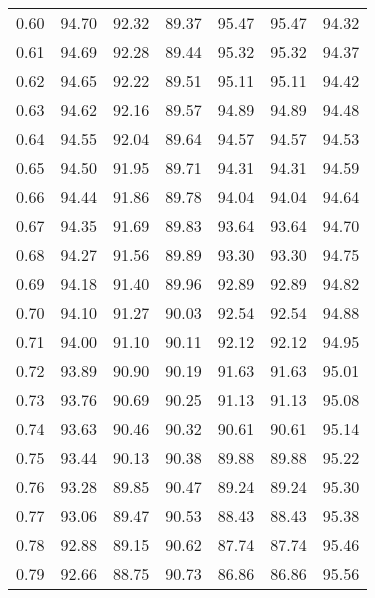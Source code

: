 \begin{tabular}{|c|c|c|c|c|c|c|}
      0.60 &     94.70 &     92.32 &      89.37 &   95.47 &      95.47 &         94.32 \\
      0.61 &     94.69 &     92.28 &      89.44 &   95.32 &      95.32 &         94.37 \\
      0.62 &     94.65 &     92.22 &      89.51 &   95.11 &      95.11 &         94.42 \\
      0.63 &     94.62 &     92.16 &      89.57 &   94.89 &      94.89 &         94.48 \\
      0.64 &     94.55 &     92.04 &      89.64 &   94.57 &      94.57 &         94.53 \\
      0.65 &     94.50 &     91.95 &      89.71 &   94.31 &      94.31 &         94.59 \\
      0.66 &     94.44 &     91.86 &      89.78 &   94.04 &      94.04 &         94.64 \\
      0.67 &     94.35 &     91.69 &      89.83 &   93.64 &      93.64 &         94.70 \\
      0.68 &     94.27 &     91.56 &      89.89 &   93.30 &      93.30 &         94.75 \\
      0.69 &     94.18 &     91.40 &      89.96 &   92.89 &      92.89 &         94.82 \\
      0.70 &     94.10 &     91.27 &      90.03 &   92.54 &      92.54 &         94.88 \\
      0.71 &     94.00 &     91.10 &      90.11 &   92.12 &      92.12 &         94.95 \\
      0.72 &     93.89 &     90.90 &      90.19 &   91.63 &      91.63 &         95.01 \\
      0.73 &     93.76 &     90.69 &      90.25 &   91.13 &      91.13 &         95.08 \\
      0.74 &     93.63 &     90.46 &      90.32 &   90.61 &      90.61 &         95.14 \\
      0.75 &     93.44 &     90.13 &      90.38 &   89.88 &      89.88 &         95.22 \\
      0.76 &     93.28 &     89.85 &      90.47 &   89.24 &      89.24 &         95.30 \\
      0.77 &     93.06 &     89.47 &      90.53 &   88.43 &      88.43 &         95.38 \\
      0.78 &     92.88 &     89.15 &      90.62 &   87.74 &      87.74 &         95.46 \\
      0.79 &     92.66 &     88.75 &      90.73 &   86.86 &      86.86 &         95.56 \\

\end{tabular}
